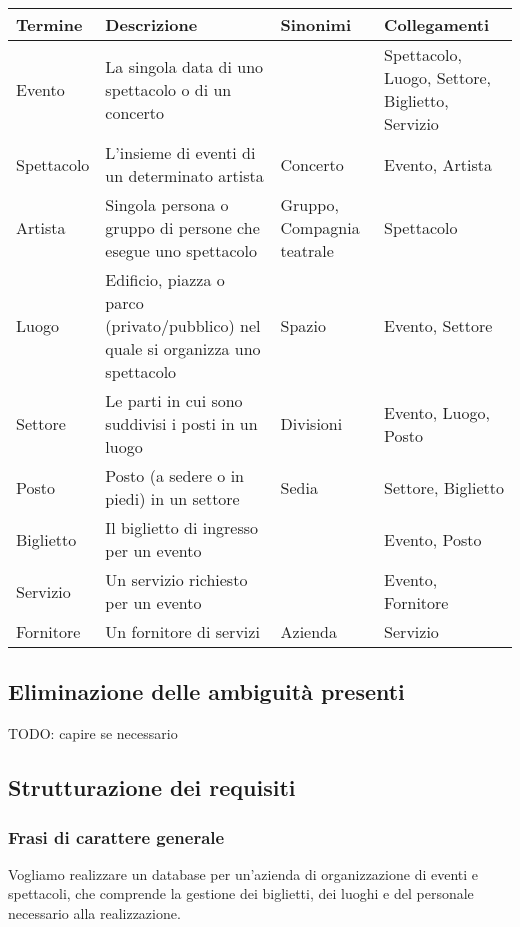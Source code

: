 \documentclass[a4paper,11pt]{article}
\begin{document}
\begin{tabularx}{\textwidth}{|X|>{\raggedright\arraybackslash}X|X|>{\raggedright\arraybackslash}X|}
\hline
\textbf{Termine} & \textbf{Descrizione} & \textbf{Sinonimi} & \textbf{Collegamenti}\\
\hline
Evento & La singola data di uno spettacolo o di un concerto &  & Spettacolo, Luogo, Settore, Biglietto, Servizio\\
\hline
Spettacolo & L'insieme di eventi di un determinato artista & Concerto & Evento, Artista\\
\hline
Artista & Singola persona o gruppo di persone che esegue uno spettacolo & Gruppo, Compagnia teatrale & Spettacolo\\
\hline
Luogo & Edificio, piazza o parco (privato/pubblico) nel quale si organizza uno spettacolo & Spazio & Evento, Settore\\
\hline
Settore & Le parti in cui sono suddivisi i posti in un luogo & Divisioni & Evento, Luogo, Posto\\
\hline
Posto & Posto (a sedere o in piedi) in un settore & Sedia & Settore, Biglietto\\
\hline
Biglietto & Il biglietto di ingresso per un evento &  & Evento, Posto\\
\hline
Servizio & Un servizio richiesto per un evento &  & Evento, Fornitore\\
\hline
Fornitore & Un fornitore di servizi & Azienda & Servizio\\
\hline
\end{tabularx}

\subsection{Eliminazione delle ambiguità presenti}
TODO: capire se necessario


\subsection{Strutturazione dei requisiti}

\subsubsection*{Frasi di carattere generale}

Vogliamo realizzare un database per un'azienda di organizzazione di eventi e spettacoli, che comprende la gestione dei biglietti, dei luoghi e del personale necessario alla realizzazione.
\end{document}
